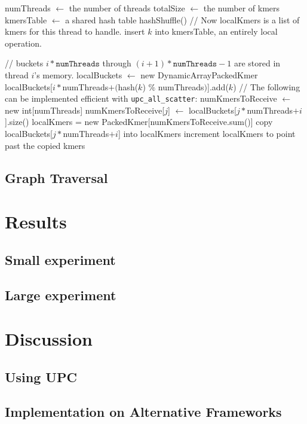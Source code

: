 \documentclass{article}
\begin{document}
\begin{algorithmic}
\State numThreads $\gets$ the number of threads
\State totalSize $\gets$ the number of kmers
\State kmersTable $\gets$ a shared hash table
\State hashShuffle()
\State // Now localKmers is a list of kmers for this thread to handle.
  \State insert $k$ into kmersTable, an entirely local operation.
\EndFor

  \State // buckets $i*\texttt{numThreads}$ through $(i+1)*\texttt{numThreads}-1$ are stored in thread $i$'s memory.
  \State localBuckets $\gets$ new DynamicArray\<PackedKmer
    \State localBuckets[$i*$numThreads$ + ($hash($k$) $\%$ numThreads$)$].add($k$)
  \EndFor
    \State // The following can be implemented efficient with \texttt{upc_all_scatter}:
    \State numKmersToReceive $\gets$ new int[numThreads]
      \State numKmersToReceive[$j$] $\gets$ localBuckets[$j*$numThreads$+i$].size()
    \EndFor
    localKmers = new PackedKmer[numKmersToReceive.sum()]
      \State copy localBuckets[$j*$numThreads$+i$] into localKmers
      \State increment localKmers to point past the copied kmers
    \EndFor
  \EndFor
\EndFunction

\end{algorithmic}

\subsection{Graph Traversal}


\section{Results}
\subsection{Small experiment}
\subsection{Large experiment}

\section{Discussion}
\subsection{Using UPC}

\subsection{Implementation on Alternative Frameworks}

%
%
\end{document}
